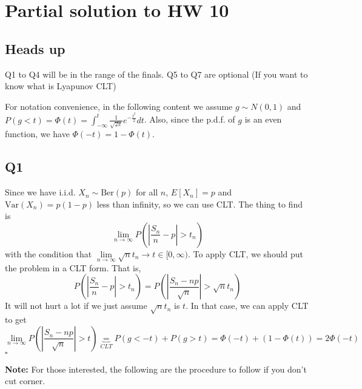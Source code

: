 \documentclass[12pt]{article}
\begin{document}
\newcommand*{\horzbar}{\rule[.5ex]{2.5ex}{0.5pt}}

\section*{Partial solution to HW 10}
\subsection*{Heads up}
Q1 to Q4 will be in the range of the finals. Q5 to Q7 are optional (If you want to know what is Lyapunov CLT) 

For notation convenience, in the following content we assume \(g \sim N(0,1)\) and \(P(g < t) = \Phi(t) = \int_{-\infty }^{t} \frac{1}{\sqrt{2 \pi }} e^{- \frac{t^2}{2}} dt \).  
Also, since the p.d.f. of \(g\) is an even function, we have \(\Phi(-t) = 1-\Phi(t)\).  
\subsection*{Q1}
Since we have i.i.d. \(X_n \sim \text{Ber}(p) \) for all \(n\), \(E[X_n] =p\) and \(\text{Var} (X_{n} ) = p(1-p)\) less than infinity, so we can use CLT. 
The thing to find is  
\[
    \lim\limits_{n \to \infty} P(\left\vert \frac{S_{n}}{n} -p \right\vert > t_{n}) 
\] 
with the condition that \(\lim\limits_{n \to \infty} \sqrt{n} t_{n} \to t \in [0,\infty )\). 
To apply CLT, we should put the problem in a CLT form. That is, 
\[
    P(\left\vert \frac{S_{n}}{n} -p \right\vert > t_{n}) = P(\left\vert \frac{S_{n} - np}{\sqrt{n} } \right\vert > \sqrt{n} t_{n}) 
\]
It will not hurt a lot if we just assume \(\sqrt{n} t_{n}\) is \(t\). In that case, we can apply CLT to get 
\[
    \lim\limits_{n \to \infty} P(\left\vert \frac{S_{n} - np}{\sqrt{n} } \right\vert > t) \underbrace{=}_{CLT} P(g<-t) + P(g > t) = \Phi(-t) + (1-\Phi(t)) = 2\Phi(-t) 
\]
\hspace{\textwidth}\(\square\) 

\textbf{Note:} For those interested, the following are the procedure to follow if you don't cut corner.  
\end{document}

